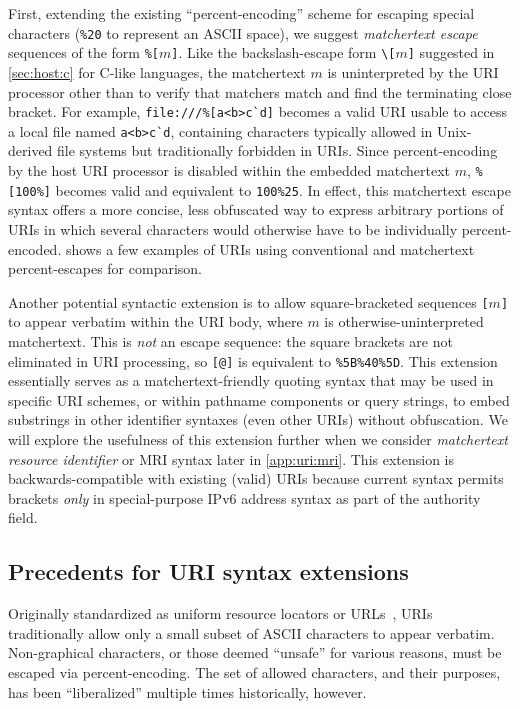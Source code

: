 First, extending the existing ``percent-encoding'' scheme
for escaping special characters
(\eg \verb|%20| to represent an ASCII space),
we suggest \emph{matchertext escape} sequences
of the form \verb|%[|$m$\verb|]|.
Like the backslash-escape form \verb|\[|$m$\verb|]|
suggested in \cref{sec:host:c} for C-like languages,
the matchertext $m$ is uninterpreted by the URI processor
other than to verify that matchers match
and find the terminating close bracket.
For example, \verb|file:///%[a<b>c`d]| becomes
a valid URI usable to access a local file named \verb|a<b>c`d|,
containing characters typically allowed in Unix-derived file systems
but traditionally forbidden in URIs.
Since percent-encoding by the host URI processor
is disabled within the embedded matchertext $m$,
\verb|%[100%]| becomes valid and equivalent to \verb|100%25|.
In effect, this matchertext escape syntax offers
a more concise, less obfuscated way to express arbitrary portions of URIs
in which several characters
would otherwise have to be individually percent-encoded.
 shows a few examples of URIs
using conventional and matchertext percent-escapes for comparison.

Another potential syntactic extension is to allow
square-bracketed sequences \verb|[|$m$\verb|]|
to appear verbatim within the URI body,
where $m$ is otherwise-uninterpreted matchertext.
This is \emph{not} an escape sequence:
the square brackets are not eliminated in URI processing,
so \verb|[@]| is equivalent to \verb|%5B%40%5D|.
This extension essentially serves as a matchertext-friendly quoting syntax
that may be used in specific URI schemes,
or within pathname components or query strings,
to embed substrings in other identifier syntaxes (even other URIs)
without obfuscation.
We will explore the usefulness of this extension further
when we consider \emph{matchertext resource identifier} or MRI syntax
later in \cref{app:uri:mri}.
This extension is backwards-compatible with existing (valid) URIs
because current syntax permits brackets \emph{only}
in special-purpose IPv6 address syntax as part of the authority field.




\subsection{Precedents for URI syntax extensions}

Originally standardized as uniform resource locators or URLs~\cite{rfc1738},
URIs traditionally allow only a small subset of ASCII characters
to appear verbatim.
Non-graphical characters,
or those deemed ``unsafe'' for various reasons,
must be escaped via percent-encoding.
The set of allowed characters, and their purposes,
has been ``liberalized'' multiple times historically, however.

